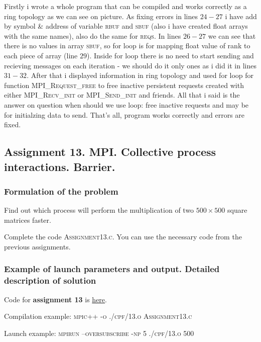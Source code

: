 \documentclass[%
12pt, %
final, %
oneside, %
onecolumn, %
centertags]{article} %
\theoremstyle{plain}
\theoremstyle{definition}
\theoremstyle{remark}
\begin{document}
Firstly i wrote a whole program that can be compiled and works correctly as a ring topology as we can see on picture. As fixing errors in lines $24-27$ i have add by symbol \textsc{\&} address of variable \textsc{rbuf} and \textsc{sbuf} (also i have created float arrays with the same names), also do the same for \textsc{reqs}. In lines $26-27$ we can see that there is no values in array \textsc{sbuf}, so for loop is for mapping float value of rank to each piece of array (line $29$). Inside for loop there is no need to start sending and recieving messages on each iteration - we should do it only ones as i did it in lines $31-32$. After that i displayed information in ring topology and used for loop for function \textsc{MPI\_Request\_free} to free inactive persistent requests created with either \textsc{MPI\_Recv\_init} or \textsc{MPI\_Send\_init} and friends. All that i said is the answer on question when should we use loop: free inactive requests and may be for initialzing data to send. That's all, program works correctly and errors are fixed. 


\newpage
\subsection{Assignment 13. MPI. Collective process interactions. Barrier.}

\subsubsection{Formulation of the problem}

Find out which process will perform the multiplication of two $500 \times 500$ square matrices faster.

Complete the code \textsc{Assignment13.c}. You can use the necessary code from the previous assignments.


\subsubsection{Example of launch parameters and output. Detailed description of solution}

Code for \textbf{assignment 13} is \href{https:\//github.com/aptmess/parallel_algorithms/blob/master/HT/hw_mpi/Assignment13.c}{here}.

Compilation example: \textsc{mpic++ -o ./cpf/13.o Assignment13.c}

Launch example: \textsc{mpirun --oversubscribe -np 5 ./cpf/13.o 500}
\end{document}
